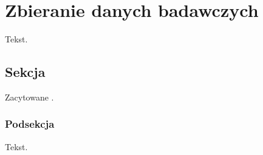 \chapter{Zbieranie danych badawczych}

Tekst.

\section{Sekcja}

Zacytowane \cite{JakasNazwa}.

\subsection{Podsekcja}

Tekst.
